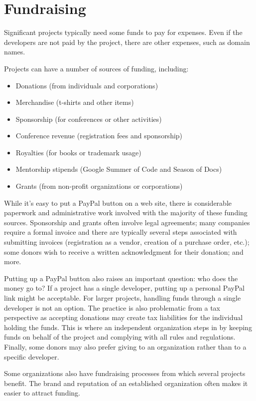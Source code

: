 


\chapter{Fundraising}

Significant projects typically need some funds to pay for expenses.  Even if the developers are not paid by the project, there are other expenses, such as domain names.

Projects can have a number of sources of funding, including:

\begin{itemize}

\item Donations (from individuals and corporations)
\item Merchandise (t-shirts and other items)
\item Sponsorship (for conferences or other activities)
\item Conference revenue (registration fees and sponsorship)
\item Royalties (for books or trademark usage)
\item Mentorship stipends (Google Summer of Code and Season of Docs)
\item Grants (from non-profit organizations or corporations)

\end{itemize}

While it's easy to put a PayPal button on a web site, there is considerable paperwork and administrative work involved with the majority of these funding sources.  Sponsorship and grants often involve legal agreements; many companies require a formal invoice and there are typically several steps associated with submitting invoices (registration as a vendor, creation of a purchase order, etc.); some donors wish to receive a written acknowledgment for their donation; and more.

Putting up a PayPal button also raises an important question: who does the money go to?  If a project has a single developer, putting up a personal PayPal link might be acceptable.  For larger projects, handling funds through a single developer is not an option.  The practice is also problematic from a tax perspective as accepting donations may create tax liabilities for the individual holding the funds.  This is where an independent organization steps in by keeping funds on behalf of the project and complying with all rules and regulations.  Finally, some donors may also prefer giving to an organization rather than to a specific developer.

Some organizations also have fundraising processes from which several projects benefit.  The brand and reputation of an established organization often makes it easier to attract funding.

